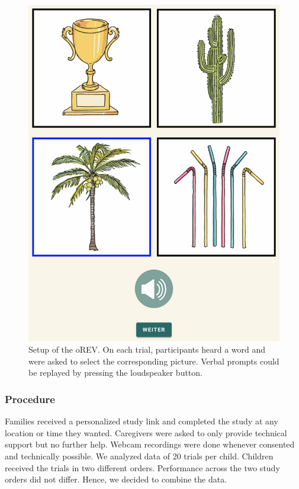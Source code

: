 \documentclass[
  man,floatsintext]{apa6}
\begin{document}
\begin{figure}

{\centering \includegraphics[width=1\linewidth]{../figures/orev_procedure} 

}

\caption{Setup of the oREV. On each trial, participants heard a word and were asked to select the corresponding picture. Verbal prompts could be replayed by pressing the loudspeaker button.}\label{fig:fig5}
\end{figure}

\hypertarget{procedure}{%
\subsubsection{Procedure}\label{procedure}}

Families received a personalized study link and completed the study at any location or time they wanted. Caregivers were asked to only provide technical support but no further help. Webcam recordings were done whenever consented and technically possible. We analyzed data of 20 trials per child. Children received the trials in two different orders. Performance across the two study orders did not differ. Hence, we decided to combine the data.
\end{document}

